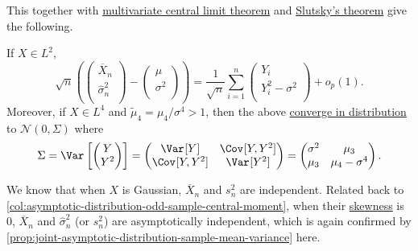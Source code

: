 This together with \hyperref[thm:multivariate-CLT]{multivariate central limit theorem} and \hyperref[thm:Slutsky]{Slutsky's theorem} give the following.

\begin{proposition}\label{prop:joint-asymptotic-distribution-sample-mean-variance}
	If \(X \in L^2\),
	\[
		\sqrt{n} \left( \begin{pmatrix}
				\overline{X} _n   \\
				\hat{\sigma} _n^2 \\
			\end{pmatrix} - \begin{pmatrix}
				\mu       \\
				\sigma ^2 \\
			\end{pmatrix} \right)
		= \frac{1}{\sqrt{n} } \sum_{i=1}^{n} \begin{pmatrix}
			Y_i               \\
			Y_i^2 - \sigma ^2 \\
		\end{pmatrix} + o_p(1).
	\]
	Moreover, if \(X \in L^4\) and \(\widetilde{\mu} _4 = \mu _4 / \sigma ^4 > 1\), then the above \hyperref[def:converge-in-distribution]{converge in distribution} to \(\mathcal{N} (0, \Sigma )\) where
	\[
		\Sigma
		= \Var_{}\left[\begin{pmatrix}
				Y   \\
				Y^2 \\
			\end{pmatrix} \right]
		= \begin{pmatrix}
			\Var_{}[Y]      & \Cov_{}[Y, Y^2] \\
			\Cov_{}[Y, Y^2] & \Var_{}[Y^2]    \\
		\end{pmatrix}
		= \begin{pmatrix}
			\sigma ^2 & \mu _3             \\
			\mu _3    & \mu _4 - \sigma ^4 \\
		\end{pmatrix}.
	\]
\end{proposition}

\begin{remark}
	We know that when \(X\) is Gaussian, \(\overline{X} _n\) and \(s_n^2\) are independent. Related back to \autoref{col:asymptotic-distribution-odd-sample-central-moment}, when their \hyperref[def:skewness]{skewness} is \(0\), \(\overline{X} _n\) and \(\hat{\sigma} _n^2\) (or \(s_n^2\)) are asymptotically independent, which is again confirmed by \autoref{prop:joint-asymptotic-distribution-sample-mean-variance} here.
\end{remark}

